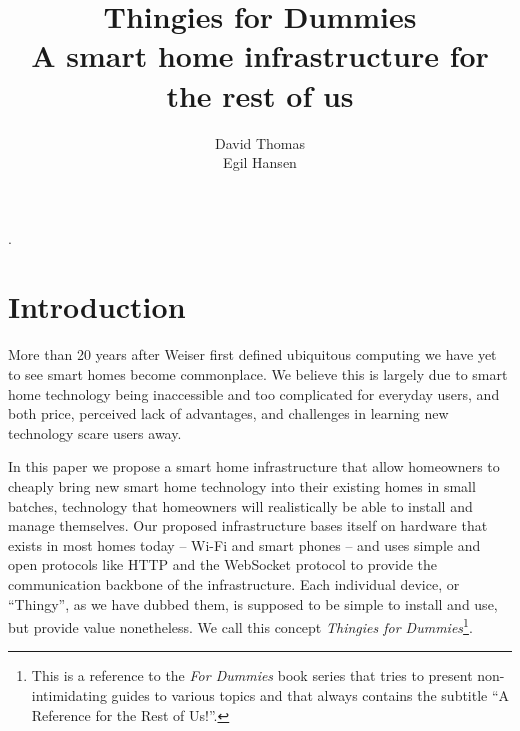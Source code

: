 \documentclass{ubicomp2012}
\begin{document}
\setlength{\paperheight}{11in}
\setlength{\paperwidth}{8.5in}
\setlength{\pdfpageheight}{\paperheight}
\setlength{\pdfpagewidth}{\paperwidth}


\title{Thingies for Dummies\\A smart home infrastructure for the rest of us}
\author{
  \alignauthor David Thomas\\
 \alignauthor Egil Hansen\\
      }
\maketitle

\begin{abstract}

\end{abstract}


.


\section{Introduction}

More than 20 years after Weiser first defined ubiquitous computing \cite{Weiser1991} we have yet to see smart homes become commonplace. We believe this is largely due to smart home technology being inaccessible and too complicated for everyday users, and both price, perceived lack of advantages, and challenges in learning new technology scare users away.

In this paper we propose a smart home infrastructure that allow homeowners to cheaply bring new smart home technology into their existing homes in small batches, technology that homeowners will realistically be able to install and manage themselves. Our proposed infrastructure bases itself on hardware that exists in most homes today -- Wi-Fi and smart phones -- and uses simple and open protocols like HTTP and the WebSocket protocol to provide the communication backbone of the infrastructure. Each individual device, or ``Thingy'', as we have dubbed them, is supposed to be simple to install and use, but provide value nonetheless. We call this concept \textit{Thingies for Dummies}\footnote{This is a reference to the \textit{For Dummies} book series that tries to present non-intimidating guides to various topics and that always contains the subtitle ``A Reference for the Rest of Us!''.}.
\end{document}
